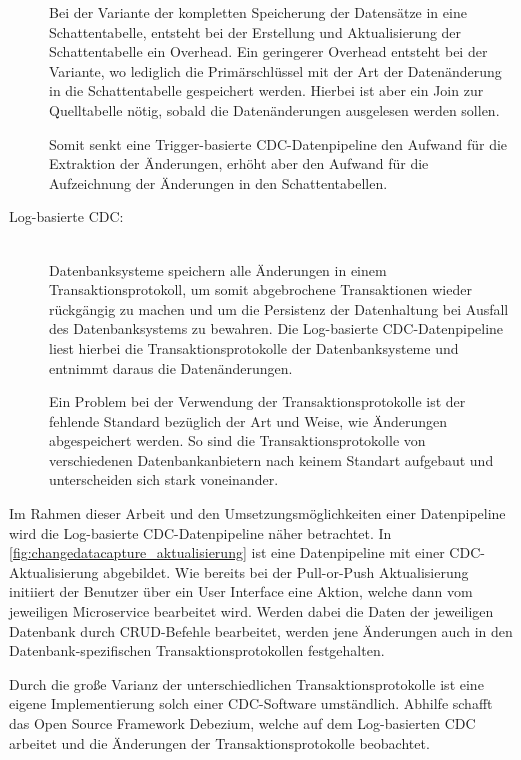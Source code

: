 \begin{description}
    Bei der Variante der kompletten Speicherung der Datensätze in eine Schattentabelle, entsteht bei der Erstellung und Aktualisierung der Schattentabelle ein Overhead. Ein geringerer Overhead entsteht bei der Variante, wo lediglich die Primärschlüssel mit der Art der Datenänderung in die Schattentabelle gespeichert werden. Hierbei ist aber ein Join zur Quelltabelle nötig, sobald die Datenänderungen ausgelesen werden sollen.

    Somit senkt eine Trigger-basierte CDC-Datenpipeline den Aufwand für die Extraktion der Änderungen, erhöht aber den Aufwand für die Aufzeichnung der Änderungen in den Schattentabellen.

    \item[Log-basierte CDC:]\hfill \\
    Datenbanksysteme speichern alle Änderungen in einem Transaktionsprotokoll, um somit abgebrochene Transaktionen wieder rückgängig zu machen und um die Persistenz der Datenhaltung bei Ausfall des Datenbanksystems zu bewahren. Die Log-basierte CDC-Datenpipeline liest hierbei die Transaktionsprotokolle der Datenbanksysteme und entnimmt daraus die Datenänderungen.

    Ein Problem bei der Verwendung der Transaktionsprotokolle ist der fehlende Standard bezüglich der Art und Weise, wie Änderungen abgespeichert werden. So sind die Transaktionsprotokolle von verschiedenen Datenbankanbietern nach keinem Standart aufgebaut und unterscheiden sich stark voneinander.

\end{description}

Im Rahmen dieser Arbeit und den Umsetzungsmöglichkeiten einer Datenpipeline wird die Log-basierte CDC-Datenpipeline näher betrachtet. In \autoref{fig:changedatacapture_aktualisierung} ist eine Datenpipeline mit einer CDC-Aktualisierung abgebildet. Wie bereits bei der Pull-or-Push Aktualisierung initiiert der Benutzer über ein User Interface eine Aktion, welche dann vom jeweiligen Microservice bearbeitet wird. Werden dabei die Daten der jeweiligen Datenbank durch CRUD-Befehle bearbeitet, werden jene Änderungen auch in den Datenbank-spezifischen Transaktionsprotokollen festgehalten.

Durch die große Varianz der unterschiedlichen Transaktionsprotokolle ist eine eigene Implementierung solch einer CDC-Software umständlich. Abhilfe schafft das Open Source Framework \glqq Debezium\grqq{}, welche auf dem Log-basierten CDC arbeitet und die Änderungen der Transaktionsprotokolle beobachtet.

